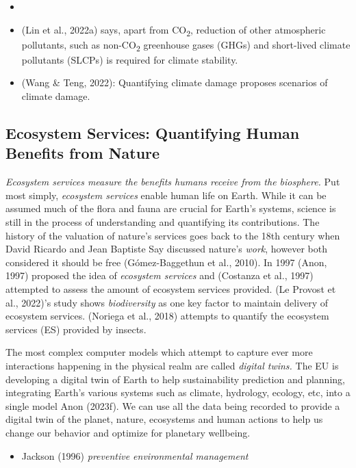\documentclass[
  letterpaper,
  DIV=11,
  numbers=noendperiod]{scrartcl}
\providecommand{\tightlist}{%
  \setlength{\itemsep}{0pt}\setlength{\parskip}{0pt}}\usepackage{longtable,booktabs,array}
\begin{document}
\begin{itemize}
\item
\item
  (Lin et al., 2022a) says, apart from CO\textsubscript{2}, reduction of
  other atmospheric pollutants, such as non-CO\textsubscript{2}
  greenhouse gases (GHGs) and short-lived climate pollutants (SLCPs) is
  required for climate stability.
\item
  (Wang \& Teng, 2022): Quantifying climate damage proposes scenarios of
  climate damage.
\end{itemize}

\subsection{Ecosystem Services: Quantifying Human Benefits from
Nature}\label{ecosystem-services-quantifying-human-benefits-from-nature}

\emph{Ecosystem services measure the benefits humans receive from the
biosphere.} Put most simply, \emph{ecosystem services} enable human life
on Earth. While it can be assumed much of the flora and fauna are
crucial for Earth's systems, science is still in the process of
understanding and quantifying its contributions. The history of the
valuation of nature's services goes back to the 18th century when David
Ricardo and Jean Baptiste Say discussed nature's \emph{work}, however
both considered it should be free (Gómez-Baggethun et al., 2010). In
1997 (Anon, 1997) proposed the idea of \emph{ecosystem services} and
(Costanza et al., 1997) attempted to assess the amount of ecosystem
services provided. (Le Provost et al., 2022)'s study shows
\emph{biodiversity} as one key factor to maintain delivery of ecosystem
services. (Noriega et al., 2018) attempts to quantify the ecosystem
services (ES) provided by insects.

The most complex computer models which attempt to capture ever more
interactions happening in the physical realm are called \emph{digital
twins.} The EU is developing a digital twin of Earth to help
sustainability prediction and planning, integrating Earth's various
systems such as climate, hydrology, ecology, etc, into a single model
Anon (2023f). We can use all the data being recorded to provide a
digital twin of the planet, nature, ecosystems and human actions to help
us change our behavior and optimize for planetary wellbeing.

\begin{itemize}
\tightlist
\item
  Jackson (1996) \emph{preventive environmental management}
\end{itemize}
\end{document}
